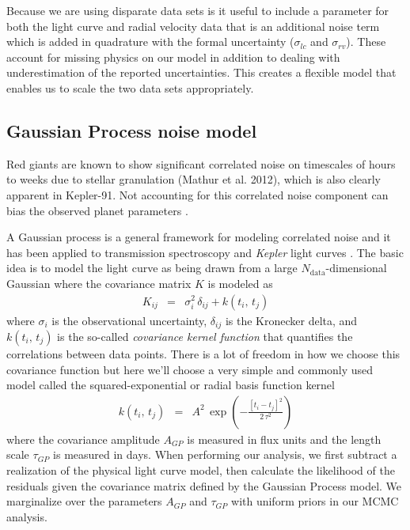 \documentclass[apjl]{emulateapj}
\begin{document}
Because we are using disparate data sets is it useful to include a parameter for both the light curve and radial velocity data that is an additional noise term which is added in quadrature with the formal uncertainty ($\sigma_{lc}$ and $\sigma_{rv}$). These account for missing physics on our model in addition to dealing with underestimation of the reported uncertainties. This creates a flexible model that enables us to scale the two data sets appropriately.

\subsection{Gaussian Process noise model}
Red giants are known to show significant correlated noise on timescales of hours to weeks due to stellar granulation (Mathur et al. 2012), which is also clearly apparent in Kepler-91. Not accounting for this correlated noise component can bias the observed planet parameters \citep{carter09}.

A Gaussian process is a general framework for modeling correlated noise
\citep{rasmussen} and it has been applied to transmission spectroscopy
\citep{gibson-gp,evans-gp} and \emph{Kepler} light curves \citep[][Dawson
\emph{et al.}\ in press]{ambikasaran14}.
The basic idea is to model the light curve as being drawn from a large
$N_\mathrm{data}$-dimensional Gaussian where the covariance matrix $K$ is
modeled as
\begin{eqnarray}
K_{ij} &=& \sigma_i^2\,\delta_{ij} + k(t_i,\,t_j)
\end{eqnarray}
where $\sigma_i$ is the observational uncertainty, $\delta_{ij}$ is the
Kronecker delta, and $k(t_i,\,t_j)$ is the so-called \emph{covariance kernel
function} that quantifies the correlations between data points.
There is a lot of freedom in how we choose this covariance function but here
we'll choose a very simple and commonly used model called the
squared-exponential or radial basis function kernel
\begin{eqnarray}
k(t_i,\,t_j) &=& A^2\,\exp\left(-\frac{[t_i-t_j]^2}{2\,\tau^2}\right)
\end{eqnarray}
where the covariance amplitude $A_{GP}$ is measured in flux units and the length
scale $\tau_{GP}$ is measured in days.
When performing our analysis, we first subtract a realization of the physical light curve model, then calculate the likelihood of the residuals given the covariance matrix defined by the Gaussian Process model. We marginalize over the parameters $A_{GP}$ and $\tau_{GP}$ with uniform priors in our MCMC analysis.
\end{document}
